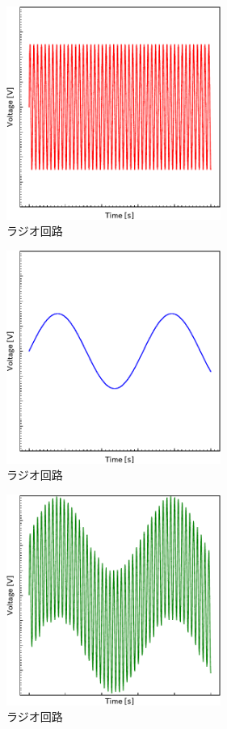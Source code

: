 \documentclass[report.tex]{subfiles}
\begin{document}
\begin{figure}[H]
	\centering
	\includegraphics[width=7cm]{fig/5V.pdf}
	\caption{ラジオ回路}
	\label{fig:5V}
\end{figure}

\begin{figure}[H]
	\centering
	\includegraphics[width=7cm]{fig/3V.pdf}
	\caption{ラジオ回路}
	\label{fig:3V}
\end{figure}

\begin{figure}[H]
	\centering
	\includegraphics[width=7cm]{fig/Wave.pdf}
	\caption{ラジオ回路}
	\label{fig:wave}
\end{figure}
\end{document}
